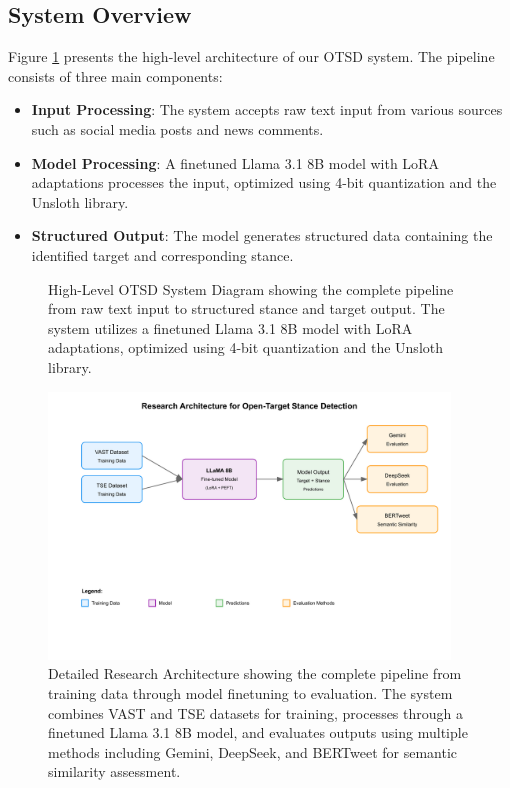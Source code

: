 \documentclass[twocolumn,11pt,letterpaper]{article}
\begin{document}
\subsection{System Overview}
\label{sec:system_overview}

Figure \ref{fig:system_diagram} presents the high-level architecture of our OTSD system. The pipeline consists of three main components:

\begin{itemize}
    \item \textbf{Input Processing}: The system accepts raw text input from various sources such as social media posts and news comments.
    \item \textbf{Model Processing}: A finetuned Llama 3.1 8B model with LoRA adaptations processes the input, optimized using 4-bit quantization and the Unsloth library.
    \item \textbf{Structured Output}: The model generates structured data containing the identified target and corresponding stance.
\end{itemize}

\begin{figure}[t]
\centering

\caption{High-Level OTSD System Diagram showing the complete pipeline from raw text input to structured stance and target output. The system utilizes a finetuned Llama 3.1 8B model with LoRA adaptations, optimized using 4-bit quantization and the Unsloth library.}
\label{fig:system_diagram}
\end{figure}

\begin{figure}[t]
\centering
\includegraphics[width=0.95\textwidth]{figures/research_architecture.pdf}
\caption{Detailed Research Architecture showing the complete pipeline from training data through model finetuning to evaluation. The system combines VAST and TSE datasets for training, processes through a finetuned Llama 3.1 8B model, and evaluates outputs using multiple methods including Gemini, DeepSeek, and BERTweet for semantic similarity assessment.}
\label{fig:research_arch}
\end{figure}
\end{document}
